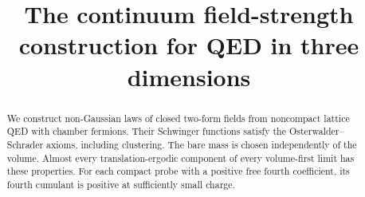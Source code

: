 \documentclass[11pt,letterpaper,reqno]{amsart}
\title[The continuum field-strength construction for QED3]{The continuum field-strength construction for QED in three dimensions}
\date{}
\begin{document}
\begin{abstract}
We construct non-Gaussian laws of closed two-form fields from noncompact lattice QED with chamber fermions. Their Schwinger functions satisfy the Osterwalder--Schrader axioms, including clustering. The bare mass is chosen independently of the volume. Almost every translation-ergodic component of every volume-first limit has these properties. For each compact probe with a positive free fourth coefficient, its fourth cumulant is positive at sufficiently small charge.
\end{abstract}
\maketitle
\tableofcontents








\printbibliography
\end{document}
